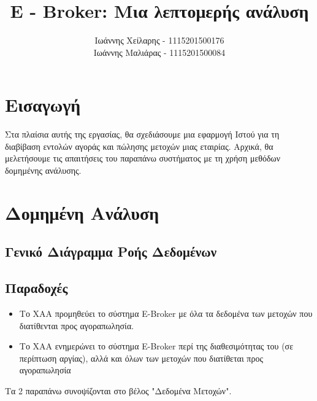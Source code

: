 \documentclass{article}
\begin{document}

\title{E - Broker: Μια λεπτομερής ανάλυση}
\author{
	Ιωάννης Χείλαρης - 1115201500176
	\\
	Ιωάννης Μαλιάρας - 1115201500084
}

\maketitle

\newpage
\tableofcontents


\newpage
\section{Εισαγωγή}
	Στα πλαίσια αυτής της εργασίας, θα σχεδιάσουμε μια εφαρμογή Ιστού για τη διαβίβαση εντολών αγοράς και πώλησης μετοχών μιας εταιρίας.
	Αρχικά, θα μελετήσουμε τις απαιτήσεις του παραπάνω συστήματος με τη χρήση μεθόδων δομημένης ανάλυσης.

	
\newpage
\section{Δομημένη Ανάλυση}
	\subsection{Γενικό Διάγραμμα Ροής Δεδομένων}

		\subsection*{Παραδοχές}
		\begin{itemize}
			\item Το ΧΑΑ προμηθεύει το σύστημα E-Broker με όλα τα δεδομένα των μετοχών που διατίθενται προς αγοραπωλησία.
			\item Το ΧΑΑ ενημερώνει το σύστημα E-Broker περί της διαθεσιμότητας του (σε περίπτωση αργίας), αλλά και όλων των μετοχών που διατίθεται προς αγοραπωλησία
		\end{itemize}

		Τα 2 παραπάνω συνοψίζονται στο βέλος "Δεδομένα Μετοχών".
\end{document}
